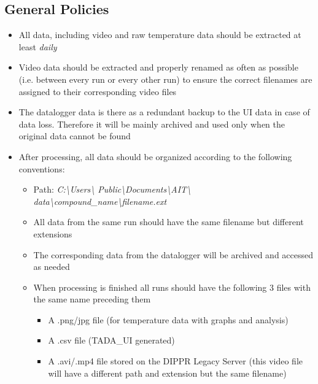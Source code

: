 \documentclass[letterpaper,11pt]{article}
\begin{document}
\subsection{General Policies}
    \begin{itemize} 
    \item All data, including video and raw temperature data should be 
        extracted at least \textit{daily}
    \item Video data should be extracted and properly renamed as often as  
        possible (i.e. between every run or every other run) to ensure the 
        correct filenames are assigned to their corresponding video files
    \item The datalogger data is there as a redundant backup to the UI data in 
        case of data loss. Therefore it will be mainly archived and used only
        when the original data cannot be found
    \item After processing, all data should be organized according to the 
        following conventions:
        \begin{itemize}
        \item Path: \textit{C:\textbackslash Users\textbackslash 
            Public\textbackslash Documents\textbackslash AIT\textbackslash 
            data\textbackslash compound\_name\textbackslash filename.ext}
        \item All data from the same run should have the same
            filename but different extensions
        \item The corresponding data from the datalogger will be archived and
            accessed as needed
        \item When processing is finished all runs should have the following 
            3 files with the same name preceding them
            \begin{itemize}
            \item A .png/jpg file (for temperature data with graphs and analysis)
            \item A .csv file (TADA\_UI generated)
            \item A .avi/.mp4 file stored on the DIPPR Legacy Server
                (this video file will have a different path and extension but 
                the same filename)
            \end{itemize}
        \end{itemize}


\end{itemize}
\end{document}
